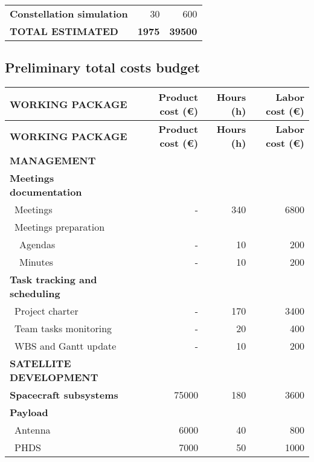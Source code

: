 \begin{longtable}{| l | r | r | }
	\textbf{Constellation simulation} & 30 & 600 \\


\rowcolor[gray]{0.65} \textbf{TOTAL ESTIMATED} & \textbf{1975} & \textbf{39500} \\
       \hline

\end{longtable}

\pagebreak

\subsection{Preliminary total costs budget}
\begin{longtable}{| l | r | r |r | }
	\hline
\rowcolor[gray]{0.65}	\textbf{WORKING PACKAGE} &\textbf{Product cost (\euro)}& \textbf{Hours (h)}     &  \textbf{Labor cost (\euro)}   \\
    \hline
    \endfirsthead

	\hline
\rowcolor[gray]{0.65}	\textbf{WORKING PACKAGE} &\textbf{Product cost (\euro)}& \textbf{Hours (h)}     &  \textbf{Labor cost (\euro)}   \\
    \hline
    \endhead

\rowcolor[gray]{0.85} \textbf{MANAGEMENT} & &  &  \\

   \textbf{Meetings documentation} & & & \\
	   \blue ~Meetings & - & 340  & 6800  \\
	   \blue ~Meetings preparation & & &   \\
	   ~~Agendas & - & 10 & 200 \\
	   ~~Minutes & - & 10 & 200 \\
	\hline
	\textbf{Task tracking and scheduling} & & & \\
	   \blue ~Project charter & - & 170 & 3400  \\
	   \blue ~Team tasks monitoring & - & 20 & 400  \\
	   \blue ~WBS and Gantt update & - & 10 & 200 \\

\rowcolor[gray]{0.85}	\textbf{SATELLITE DEVELOPMENT} & &  &   \\
	
	\textbf{Spacecraft subsystems} & 75000 & 180 & 3600  \\
	\hline
	\textbf{Payload} & & &  \\
	   \blue ~Antenna & 6000 & 40  & 800  \\
	   \blue ~PHDS & 7000 & 50  & 1000  \\


\end{longtable}
